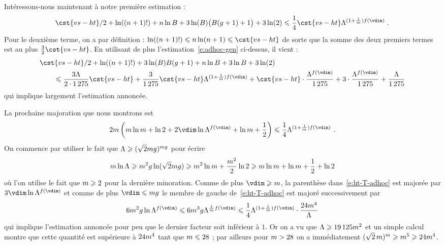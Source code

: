 Intéressons-nous maintenant à notre première estimation  :
\begin{equation} \label{e:B-siegel}
  \cst{vs-ht}/2 + \ln((\dimp+1)!) + \dimp \ln B
  + 3 \ln(B) \bigl( B(\genre+1) + 1 \bigr) + 3 \ln(2)
  \le
  \frac14 \cst{vs-ht} \Lambda^{(1 + \frac1\puiss) f(\vdim)}
  \pmm.
\end{equation}
Pour le deuxième terme, on a par définition :
\(
  \ln((\dimp+1)!)
  \le
  \dimp \ln (\dimp+1)
  \le
  \cst{vs-ht}
\)
de sorte que la somme des deux premiers termes est au plus \( \frac32
  \cst{vs-ht} \).
En utilisant de plus l'estimation~\eqref{e:adhoc-gen} ci-dessus, il vient :
\begin{align}
  & \cst{vs-ht}/2 + \ln((\dimp+1)!)
  + 3 \ln(B) B(\genre+1) + \dimp \ln B + 3\ln B + 3 \ln(2)
  \\ & \qquad \le
  \frac{3\Lambda}{2\cdot1\,275} \cst{vs-ht}
  + \frac3{1\,275} \cst{vs-ht} \Lambda^{(1 + \frac1\puiss) f(\vdim)}
  + \cst{vs-ht} \cdot \frac{ \Lambda^{f(\vdim)} }{ 1\,275 }
  + 3 \cdot \frac{ \Lambda^{f(\vdim)} }{ 1\,275 }
  + \frac{ \Lambda }{ 1\,275 }
\end{align}
qui implique largement l'estimation annoncée.

\medskip

La prochaine majoration  que nous montrons est
\begin{equation} \label{e:ht-T-adhoc}
  2\puiss \left(
    \puiss \ln \puiss + \ln 2 + 2\vdim \ln \Lambda^{f(\vdim)}
    + \ln \puiss + \frac12
  \right)
  \le
  \frac14 \Lambda^{ (1 + \frac1\puiss) f(\vdim) }
  \pmm.
\end{equation}
On commence par utiliser le fait que \( \Lambda \geqslant (\sqrt2
  mg)^{mg} \) pour écrire
\begin{equation}
  m \ln \Lambda
  \geqslant
  m^2 g \ln( \sqrt2 m g )
  \geqslant
  m^2 \ln m + \frac{ m^2 }2 \ln 2
  \geqslant
  m \ln m + \ln m + \frac12 + \ln 2
\end{equation}
où l'on utilise le fait que \( m \geqslant 2 \) pour la dernière minoration.
Comme de plus \( \vdim \ge \puiss \), la parenthèse dans~\eqref{e:ht-T-adhoc}
est majorée par \( 3\vdim \ln \Lambda^{f(\vdim)} \) et comme de plus \( \vdim
  \le \puiss\genre \) le membre de gauche de~\eqref{e:ht-T-adhoc} est majoré
successivement par
\begin{equation}
  6 \puiss^2 \genre \ln \Lambda^{f(\vdim)}
  \le
  6 \puiss^3 \genre \Lambda^{\frac1\puiss f(\vdim)}
  \le
  \frac14 \Lambda^{(1 + \frac1\puiss) f(\vdim)}
  \cdot \frac{ 24 \puiss^4 }{ \Lambda }
\end{equation}
qui implique l'estimation annoncée pour peu que le dernier facteur soit
inférieur à \( 1 \). Or on a vu que \( \Lambda \geqslant 19\,125 m^2 \) et un
simple calcul montre que cette quantité est supérieure à \( 24 m^4 \)
tant que \( m \leqslant 28 \) ; par ailleurs pour \( m > 28 \) on a
immédiatement \( (\sqrt2 \, m)^m \geqslant m^5 \geqslant 24 m^4 \).

